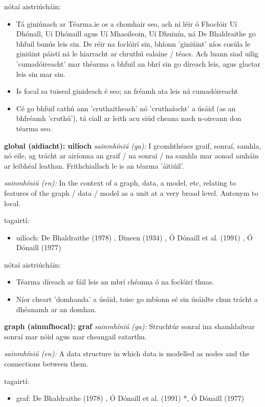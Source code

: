 \documentclass{article}
\begin{document}
nótaí aistriúcháin:
\begin{itemize}
	\item Tá giniúnach ar Téarma.ie os a chomhair seo, ach ní léir ó Fhoclóir Uí Dhónall, Uí Dhónaill agus Uí Mhaoileoin, Uí Dhuinín, ná De Bhaldraithe go bhfuil bunús leis sin. De réir na foclóirí sin, bhíonn 'giniúint' níos cosúla le giniúint páistí ná le hiarracht ar chruthú ealaíne / téacs. Ach luann siad uilig 'cumadóireacht' mar théarma a bhfuil an bhrí sin go díreach leis, agus glactar leis sin mar sin.
	\item Is focal sa tuiseal ginideach é seo; an fréamh ata leis ná cumadóireacht
	\item Cé go bhfuil cathú ann 'cruthaitheach' nó 'cruthaíocht' a úsáid (as an bhfréamh 'cruthú'), tá ciall ar leith acu siúd cheana nach n-oireann don téarma seo.
\end{itemize}


\textbf{global (aidiacht): uilíoch}
\textit{sainmhíniú (ga):} I gcomhthéacs graif, sonraí, samhla, nó eile, ag trácht ar airíonna an graif / na sonraí / na samhla mar aonad amháin ar leibhéal leathan. Frithchiallach le is an téarma 'áitiúil'.

\textit{sainmhíniú (en):} In the context of a graph, data, a model, etc, relating to features of the graph / data / model as a unit at a very broad level. Antonym to local.

tagairtí:
\begin{itemize}
	\item uilíoch: De Bhaldraithe (1978) \cite{de-bhaldraithe}, Dineen (1934) \cite{dineen}, Ó Dónaill et al. (1991) \cite{focloir-beag}, Ó Dónaill (1977) \cite{odonaill}
\end{itemize}

nótaí aistriúcháin:
\begin{itemize}
	\item Téarma díreach ar fáil leis an mbrí chéanna ó na foclóirí thuas.
	\item Níor cheart 'domhanda' a úsáid, toisc go mbíonn sé sin úsáidte chun trácht a dhéanamh ar an domhan.
\end{itemize}


\textbf{graph (ainmfhocal): graf}
\textit{sainmhíniú (ga):} Struchtúr sonraí ina shamhlaítear sonraí mar nóid agus mar cheangail eatarthu.

\textit{sainmhíniú (en):} A data structure in which data is modelled as nodes and the connections between them.

tagairtí:
\begin{itemize}
	\item graf: De Bhaldraithe (1978) \cite{de-bhaldraithe}, Ó Dónaill et al. (1991) \cite{focloir-beag}*, Ó Dónaill (1977) \cite{odonaill}
\end{itemize}
\end{document}
